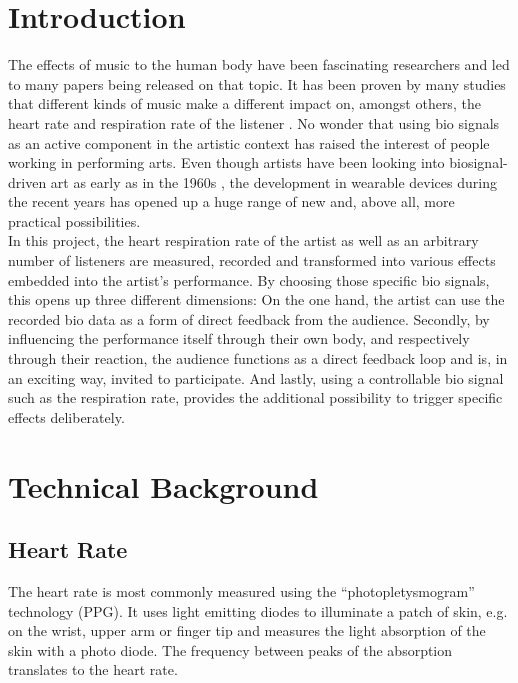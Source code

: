 \documentclass{sigchi-ext}
\begin{document}
\section{Introduction}
The effects of music to the human body have been fascinating researchers and led to
many papers being released on that topic. It has been proven by many studies that
different kinds of music make a different impact on, amongst others, the heart rate and
respiration rate of the listener \cite{dousty,shin,tsuroka,inesta2008heart}. No wonder 
that using bio signals as an active component in the artistic context has raised the 
interest of people working in performing arts. Even though artists have been looking into 
biosignal-driven art as early as in the 1960s \cite{history_biosignal_art}, the development
in wearable devices during the recent years has opened up a huge range of new and, above
all, more practical possibilities. \\
In this project, the heart respiration rate of the artist as well as an arbitrary number
of listeners are measured, recorded and transformed into various effects embedded into the
artist's performance. By choosing those specific bio signals, this opens up three different
dimensions: On the one hand, the artist can use the recorded bio data as a form of direct
feedback from the audience. Secondly, by influencing the performance itself through their
own body, and respectively through their reaction, the audience functions as a direct feedback
loop and is, in an exciting way, invited to participate. And lastly, using a controllable
bio signal such as the respiration rate, provides the additional possibility to trigger specific
effects deliberately.

\section{Technical Background}

\subsection{Heart Rate}

The heart rate is most commonly measured using the ``photopletysmogram'' technology (PPG).
It uses light emitting diodes to illuminate a patch of skin, e.g. on the wrist, upper arm
or finger tip and measures the light absorption of the skin with a photo diode. The frequency
between peaks of the absorption translates to the heart rate. %
\end{document}
